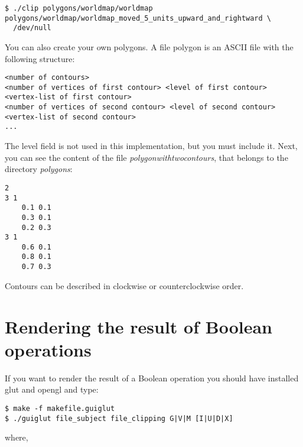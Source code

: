 \documentclass[a4paper]{article}
\begin{document}
\begin{verbatim}
$ ./clip polygons/worldmap/worldmap polygons/worldmap/worldmap_moved_5_units_upward_and_rightward \
  /dev/null
\end{verbatim}

You can also create your own polygons. A file polygon is an ASCII file with the following structure:

\begin{verbatim}
<number of contours>
<number of vertices of first contour> <level of first contour>
<vertex-list of first contour>
<number of vertices of second contour> <level of second contour>
<vertex-list of second contour>
...
\end{verbatim}

The level field is not used in this implementation, but you must include it. Next, you can see the content of the file \textit{polygonwithtwocontours}, that belongs
 to the directory \textit{polygons}:

\begin{verbatim}
2
3 1
	0.1 0.1
	0.3 0.1
	0.2 0.3
3 1
	0.6 0.1
	0.8 0.1
	0.7 0.3
\end{verbatim}

Contours can be described in clockwise or counterclockwise order.
%
%
\section{Rendering the result of Boolean operations}

If you want to render the result of a Boolean operation you should have installed glut and opengl and type:

\begin{verbatim}
$ make -f makefile.guiglut
$ ./guiglut file_subject file_clipping G|V|M [I|U|D|X]
\end{verbatim}

\noindent where,
\end{document}
